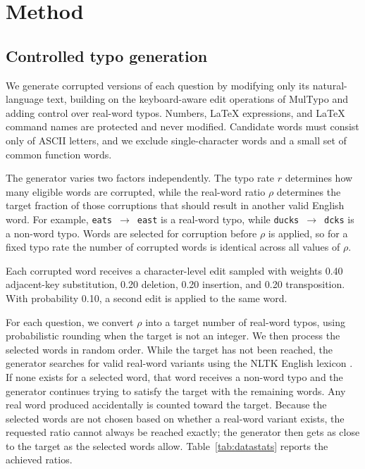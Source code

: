 \documentclass[11pt]{article}
\newcommand{\arrow}{$\rightarrow$}
\begin{document}
\section{Method}

\subsection{Controlled typo generation}

We generate corrupted versions of each question by modifying only its
natural-language text, building on the keyboard-aware edit operations of
MulTypo \citep{zhao2026} and adding control over real-word typos. Numbers, \LaTeX{} expressions, and \LaTeX{} command
names are protected and never modified. Candidate words must consist only of
ASCII letters, and we exclude single-character words and a small set of common
function words.

The generator varies two factors independently. The typo rate $r$ determines
how many eligible words are corrupted, while the real-word ratio $\rho$
determines the target fraction of those corruptions that should result in
another valid English word. For example, \texttt{eats}~\arrow~\texttt{east}
is a real-word typo, while \texttt{ducks}~\arrow~\texttt{dcks} is a non-word
typo. Words are selected for corruption before $\rho$ is applied, so for a
fixed typo rate the number of corrupted words is identical across all values
of $\rho$.

Each corrupted word receives a character-level edit sampled with weights 0.40
adjacent-key substitution, 0.20 deletion, 0.20 insertion, and 0.20
transposition. With probability 0.10, a second edit is applied to the same
word.

For each question, we convert $\rho$ into a target number of real-word typos,
using probabilistic rounding when the target is not an integer. We then process
the selected words in random order. While the target has not been reached, the
generator searches for valid real-word variants using the NLTK English lexicon
\citep{bird2009nltk}.
If none exists for a selected word, that word receives a non-word typo and the
generator continues trying to satisfy the target with the remaining words. Any
real word produced accidentally is counted toward the target. Because the
selected words are not chosen based on whether a real-word variant exists, the
requested ratio cannot always be reached exactly; the generator then gets as
close to the target as the selected words allow.
Table~\ref{tab:datastats} reports the achieved ratios.
\end{document}

